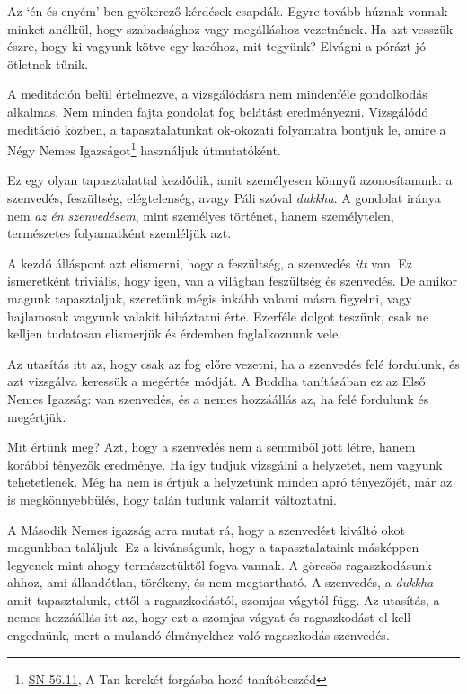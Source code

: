 Az `én és enyém'-ben gyökerező kérdések csapdák. Egyre tovább
húznak-vonnak minket anélkül, hogy szabadsághoz vagy megálláshoz
vezetnének. Ha azt vesszük észre, hogy ki vagyunk kötve egy karóhoz, mit
tegyünk? Elvágni a pórázt jó ötletnek tűnik.

A meditáción belül értelmezve, a vizsgálódásra nem mindenféle
gondolkodás alkalmas. Nem minden fajta gondolat fog belátást
eredményezni. Vizsgálódó meditáció közben, a tapasztalatunkat ok-okozati
folyamatra bontjuk le, amire a Négy Nemes Igazságot\footnote{\href{https://a-buddha-ujja.hu/sn-56.11/hu/farkas-pal}{SN
  56.11}, A Tan kerekét forgásba hozó tanítóbeszéd} használjuk
útmutatóként.

Ez egy olyan tapasztalattal kezdődik, amit személyesen könnyű
azonosítanunk: a szenvedés, feszültség, elégtelenség, avagy Páli szóval
\emph{dukkha}. A gondolat iránya nem \emph{az én szenvedésem}, mint
személyes történet, hanem személytelen, természetes folyamatként
szemléljük azt.


A kezdő álláspont azt elismerni, hogy a feszültség, a szenvedés
\emph{itt} van. Ez ismeretként triviális, hogy igen, van a világban
feszültség és szenvedés. De amikor magunk tapasztaljuk, szeretünk mégis
inkább valami másra figyelni, vagy hajlamosak vagyunk valakit hibáztatni
érte. Ezerféle dolgot teszünk, csak ne kelljen tudatosan elismerjük és
érdemben foglalkoznunk vele.

Az utasítás itt az, hogy csak az fog előre vezetni, ha a szenvedés felé
fordulunk, és azt vizsgálva keressük a megértés módját. A Buddha
tanításában ez az Első Nemes Igazság: van szenvedés, és a nemes
hozzáállás az, ha felé fordulunk és megértjük.

Mit értünk meg? Azt, hogy a szenvedés nem a semmiből jött létre, hanem
korábbi tényezők eredménye. Ha így tudjuk vizsgálni a helyzetet, nem
vagyunk tehetetlenek. Még ha nem is értjük a helyzetünk minden apró
tényezőjét, már az is megkönnyebbülés, hogy talán tudunk valamit
változtatni.


A Második Nemes igazság arra mutat rá, hogy a szenvedést kiváltó okot
magunkban találjuk. Ez a kívánságunk, hogy a tapasztalataink másképpen
legyenek mint ahogy természetüktől fogva vannak. A görcsös
ragaszkodásunk ahhoz, ami állandótlan, törékeny, és nem megtartható. A
szenvedés, a \emph{dukkha} amit tapasztalunk, ettől a ragaszkodástól,
szomjas vágytól függ. Az utasítás, a nemes hozzáállás itt az, hogy ezt a
szomjas vágyat és ragaszkodást el kell engednünk, mert a mulandó
élményekhez való ragaszkodás szenvedés.

